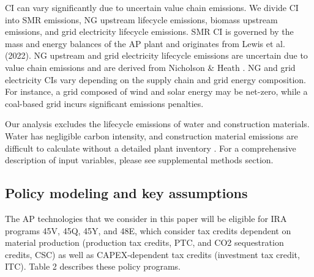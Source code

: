\documentclass{article}
\begin{document}
CI can vary significantly due to uncertain value chain emissions. We divide CI into SMR emissions, NG upstream lifecycle emissions, biomass upstream emissions, and grid electricity lifecycle emissions. SMR CI is governed by the mass and energy balances of the AP plant and originates from Lewis et al. (2022). NG upstream and grid electricity lifecycle emissions are uncertain due to value chain emissions and are derived from Nicholson \& Heath \cite{Nicholson2021}. NG and grid electricity CIs vary depending on the supply chain and grid energy composition. For instance, a grid composed of wind and solar energy may be net-zero, while a coal-based grid incurs significant emissions penalties.

Our analysis excludes the lifecycle emissions of water and construction materials. Water has negligible carbon intensity, and construction material emissions are difficult to calculate without a detailed plant inventory \cite{LEWIS2022}. For a comprehensive description of input variables, please see supplemental methods section.

\subsection*{Policy modeling and key assumptions}

The AP technologies that we consider in this paper will be eligible for IRA programs 45V, 45Q, 45Y, and 48E, which consider tax credits dependent on material production (production tax credits, PTC, and CO2 sequestration credits, CSC) as well as CAPEX-dependent tax credits (investment tax credit, ITC). Table 2 describes these policy programs.
\end{document}
